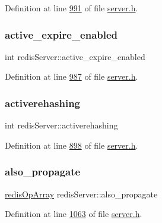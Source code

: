 Definition at line \hyperlink{server_8h_source_l00991}{991} of file \hyperlink{server_8h_source}{server.\+h}.

\mbox{\label{structredisServer_aa992ccb808477e0082425b0a53f1ca49}} 
\subsubsection{\texorpdfstring{active\+\_\+expire\+\_\+enabled}{active\_expire\_enabled}}
{\footnotesize\ttfamily int redis\+Server\+::active\+\_\+expire\+\_\+enabled}



Definition at line \hyperlink{server_8h_source_l00987}{987} of file \hyperlink{server_8h_source}{server.\+h}.

\mbox{\label{structredisServer_aa45827656091edaf379cd36182f0bfc2}} 
\subsubsection{\texorpdfstring{activerehashing}{activerehashing}}
{\footnotesize\ttfamily int redis\+Server\+::activerehashing}



Definition at line \hyperlink{server_8h_source_l00898}{898} of file \hyperlink{server_8h_source}{server.\+h}.

\mbox{\label{structredisServer_abcaa85a0442288ba52e61ab0ce7bb870}} 
\subsubsection{\texorpdfstring{also\+\_\+propagate}{also\_propagate}}
{\footnotesize\ttfamily \hyperlink{structredisOpArray}{redis\+Op\+Array} redis\+Server\+::also\+\_\+propagate}



Definition at line \hyperlink{server_8h_source_l01063}{1063} of file \hyperlink{server_8h_source}{server.\+h}.

